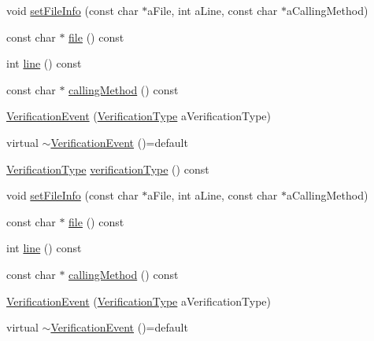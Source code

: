 \begin{DoxyCompactItemize}
\item 
void \mbox{\hyperlink{structfakeit_1_1VerificationEvent_a6199b34d65e06976395f606f0c92f361}{set\+File\+Info}} (const char $\ast$a\+File, int a\+Line, const char $\ast$a\+Calling\+Method)
\item 
const char $\ast$ \mbox{\hyperlink{structfakeit_1_1VerificationEvent_ac5e560840147ea9e20e7e802470f4d8a}{file}} () const
\item 
int \mbox{\hyperlink{structfakeit_1_1VerificationEvent_a3069b93e69102a34fca21178e931e789}{line}} () const
\item 
const char $\ast$ \mbox{\hyperlink{structfakeit_1_1VerificationEvent_a13a854b648de4ed0a11d9f1bd3d22da5}{calling\+Method}} () const
\item 
\mbox{\hyperlink{structfakeit_1_1VerificationEvent_afc2366f1ae4d03ec60cc2a2253a79728}{Verification\+Event}} (\mbox{\hyperlink{namespacefakeit_a9df22520dd60badb149c1d1d2518b253}{Verification\+Type}} a\+Verification\+Type)
\item 
virtual \mbox{\hyperlink{structfakeit_1_1VerificationEvent_a5bcca5502a6be4d65db30c1927652a77}{$\sim$\+Verification\+Event}} ()=default
\item 
\mbox{\hyperlink{namespacefakeit_a9df22520dd60badb149c1d1d2518b253}{Verification\+Type}} \mbox{\hyperlink{structfakeit_1_1VerificationEvent_a8b06372b0691ff1f6f2c4f59f5b05922}{verification\+Type}} () const
\item 
void \mbox{\hyperlink{structfakeit_1_1VerificationEvent_a6199b34d65e06976395f606f0c92f361}{set\+File\+Info}} (const char $\ast$a\+File, int a\+Line, const char $\ast$a\+Calling\+Method)
\item 
const char $\ast$ \mbox{\hyperlink{structfakeit_1_1VerificationEvent_ac5e560840147ea9e20e7e802470f4d8a}{file}} () const
\item 
int \mbox{\hyperlink{structfakeit_1_1VerificationEvent_a3069b93e69102a34fca21178e931e789}{line}} () const
\item 
const char $\ast$ \mbox{\hyperlink{structfakeit_1_1VerificationEvent_a13a854b648de4ed0a11d9f1bd3d22da5}{calling\+Method}} () const
\item 
\mbox{\hyperlink{structfakeit_1_1VerificationEvent_afc2366f1ae4d03ec60cc2a2253a79728}{Verification\+Event}} (\mbox{\hyperlink{namespacefakeit_a9df22520dd60badb149c1d1d2518b253}{Verification\+Type}} a\+Verification\+Type)
\item 
virtual \mbox{\hyperlink{structfakeit_1_1VerificationEvent_a5bcca5502a6be4d65db30c1927652a77}{$\sim$\+Verification\+Event}} ()=default

\end{DoxyCompactItemize}
